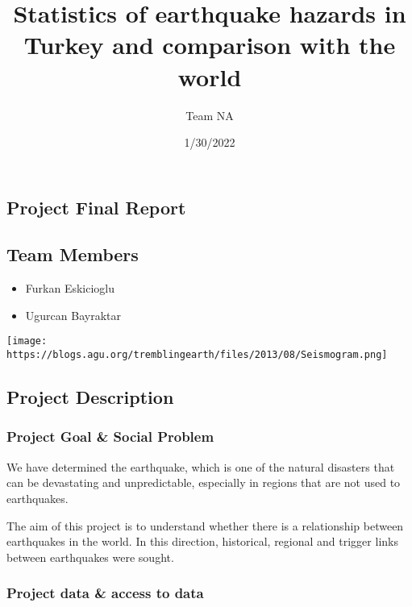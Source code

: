 \documentclass[
]{article}
\title{Statistics of earthquake hazards in Turkey and comparison with
the world}
\author{Team NA}
\date{1/30/2022}
\providecommand{\tightlist}{%
  \setlength{\itemsep}{0pt}\setlength{\parskip}{0pt}}
\begin{document}
\maketitle

\hypertarget{project-final-report}{%
\subsection{Project Final Report}\label{project-final-report}}

\hypertarget{team-members}{%
\subsection{Team Members}\label{team-members}}

\begin{itemize}
\tightlist
\item
  Furkan Eskicioglu
\item
  Ugurcan Bayraktar
\end{itemize}

\texttt{[image: https://blogs.agu.org/tremblingearth/files/2013/08/Seismogram.png]}

\hypertarget{project-description}{%
\subsection{Project Description}\label{project-description}}

\hypertarget{project-goal-social-problem}{%
\subsubsection{Project Goal \& Social
Problem}\label{project-goal-social-problem}}

We have determined the earthquake, which is one of the natural disasters
that can be devastating and unpredictable, especially in regions that
are not used to earthquakes.

The aim of this project is to understand whether there is a relationship
between earthquakes in the world. In this direction, historical,
regional and trigger links between earthquakes were sought.

\hypertarget{project-data-access-to-data}{%
\subsubsection{Project data \& access to
data}\label{project-data-access-to-data}}
\end{document}
